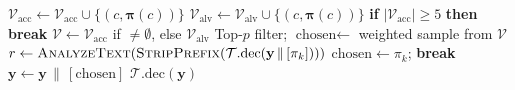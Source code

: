 \documentclass[11pt]{article}
\begin{document}
\begin{algorithm}[H]
\begin{algorithmic}[1]
            \State $\mathcal{V}_{\text{acc}} \gets
                   \mathcal{V}_{\text{acc}} \cup
                   \{(c, \boldsymbol{\pi}(c))\}$
        \EndIf
        \State $\mathcal{V}_{\text{alv}} \gets
               \mathcal{V}_{\text{alv}} \cup
               \{(c, \boldsymbol{\pi}(c))\}$
        \State \textbf{if} $|\mathcal{V}_{\text{acc}}|
               \ge 5$ \textbf{then break}
    \EndFor
    \State {}
    \State $\mathcal{V} \gets
           \mathcal{V}_{\text{acc}}$ if $\neq\emptyset$,
           else $\mathcal{V}_{\text{alv}}$
        \State Top-$p$ filter;\;
               $\text{chosen} \gets$ weighted sample
               from $\mathcal{V}$
    \Else
        \State {}
                \State $r \gets \textsc{AnalyzeText}(
                       \textsc{StripPrefix}(
                       \mathcal{T}.\text{dec}(
                       \mathbf{y} \,\|\, [\pi_k])))$
                    \State $\text{chosen} \gets \pi_k$;\;
                           \textbf{break}
                \EndIf
            \EndIf
        \EndFor
    \EndIf
    \State $\mathbf{y} \gets \mathbf{y} \,\|\,
           [\text{chosen}]$
\EndWhile
\State \Return $\mathcal{T}.\text{dec}(\mathbf{y})$
\end{algorithmic}
\end{algorithm}


\end{document}
